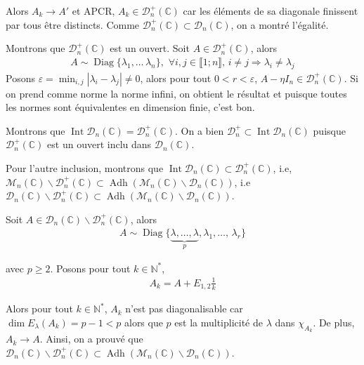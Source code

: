 \documentclass{article}
\DeclareMathOperator{\diag}{Diag}
\DeclareMathOperator{\adh}{Adh}
\DeclareMathOperator{\inte}{Int}
\begin{document}
	Alors $A_k\to A'$ et APCR, $A_k \in\mathcal{D}_n^+(\mathbb{C})$ car les éléments de sa diagonale finissent par tous être distincts. Comme $\mathcal{D}_n^+(\mathbb{C})\subset \mathcal{D}_n(\mathbb{C})$, on a montré l'égalité. 

	Montrons que $\mathcal{D}_n^+(\mathbb{C})$ est un ouvert. Soit $A\in \mathcal{D}_n^+(\mathbb{C})$, alors \begin{align*}
		A \sim \diag \{\lambda_1, \ldots\, \lambda_n\}, \,\, \forall i, j \in \llbracket 1; n\rrbracket, \,i\neq j \Rightarrow \lambda_i \neq \lambda_j
	\end{align*}
	Posons $\varepsilon = \min_{i,j} |\lambda_i-\lambda_j| \neq 0$, alors pour tout $0<r<\varepsilon$, $A-\eta I_n \in \mathcal{D}_n^+(\mathbb{C})$. Si on prend comme norme la norme infini, on obtient le résultat et puisque toutes les normes sont équivalentes en dimension finie, c'est bon.

	Montrons que $\inte \mathcal{D}_n(\mathbb{C}) = \mathcal{D}_n^+(\mathbb{C})$. On a bien $\mathcal{D}_n^+\subset \inte\mathcal{D}_n(\mathbb{C})$ puisque $\mathcal{D}_n^+(\mathbb{C})$ est un ouvert inclu dans $\mathcal{D}_n(\mathbb{C})$. 

	Pour l'autre inclusion, montrons que $\inte \mathcal{D}_n(\mathbb{C}) \subset \mathcal{D}_n^+(\mathbb{C})$, i.e, $\mathcal{M}_n(\mathbb{C})\backslash \mathcal{D}_n^+(\mathbb{C}) \subset \adh (\mathcal{M}_n(\mathbb{C})\backslash\mathcal{D}_n(\mathbb{C}))$, i.e $\mathcal{D}_n(\mathbb{C})\backslash\mathcal{D}_n^+(\mathbb{C})\subset \adh (\mathcal{M}_n(\mathbb{C})\backslash\mathcal{D}_n(\mathbb{C}))$. 

	Soit $A\in\mathcal{D}_n(\mathbb{C})\backslash\mathcal{D}_n^+(\mathbb{C})$, alors 
	\begin{align*}
	A \sim \diag\{\underbrace{\lambda, \ldots, \lambda}_{p}, \lambda_1, \ldots,\, \lambda_r\}
	\end{align*}

	avec $p\geq 2$. Posons pour tout $k\in\mathbb{N}^*$, 
	\begin{align*}
		A_k = A + E_{1, 2}\frac{1}{k}
	\end{align*}

	Alors pour tout $k\in\mathbb{N}^*$, $A_k$ n'est pas diagonalisable car $\dim E_{\lambda}(A_k) = p-1 < p$ alors que $p$ est la multiplicité de $\lambda$ dans $\chi_{A_k}$. De plus, $A_k\to A$. Ainsi, on a prouvé que $\mathcal{D}_n(\mathbb{C})\backslash\mathcal{D}_n^+(\mathbb{C}) \subset \adh(\mathcal{M}_n(\mathbb{C})\backslash\mathcal{D}_n(\mathbb{C}))$. 
	
\end{document}
